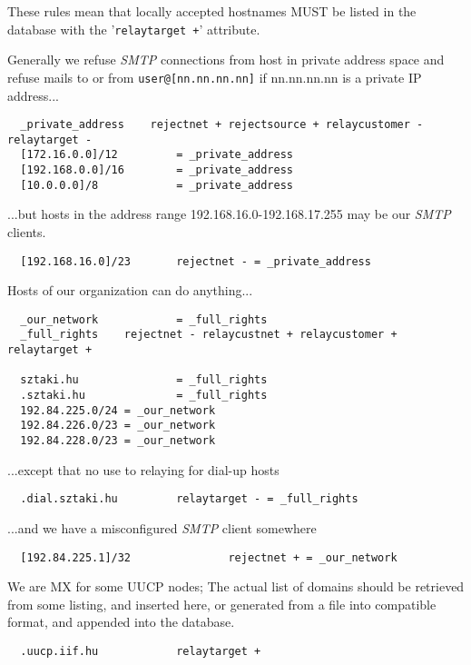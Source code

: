 These rules mean that locally accepted hostnames MUST be listed in
the database with the '{\tt relaytarget +}' attribute.

Generally we refuse {\em SMTP} connections from host in private address space
and refuse mails to or from {\tt user@[nn.nn.nn.nn]} if nn.nn.nn.nn is a
private IP address...

\begin{verbatim}
  _private_address    rejectnet + rejectsource + relaycustomer - relaytarget -
  [172.16.0.0]/12         = _private_address
  [192.168.0.0]/16        = _private_address
  [10.0.0.0]/8            = _private_address
\end{verbatim}


...but hosts in the address range 192.168.16.0-192.168.17.255 may be
our {\em SMTP} clients.

\begin{verbatim}
  [192.168.16.0]/23       rejectnet - = _private_address
\end{verbatim}


Hosts of our organization can do anything...

\begin{verbatim}
  _our_network            = _full_rights
  _full_rights    rejectnet - relaycustnet + relaycustomer + relaytarget +

  sztaki.hu               = _full_rights
  .sztaki.hu              = _full_rights
  192.84.225.0/24 = _our_network
  192.84.226.0/23 = _our_network
  192.84.228.0/23 = _our_network
\end{verbatim}


...except that no use to relaying for dial-up hosts

\begin{verbatim}
  .dial.sztaki.hu         relaytarget - = _full_rights
\end{verbatim}


...and we have a misconfigured {\em SMTP} client somewhere

\begin{verbatim}
  [192.84.225.1]/32               rejectnet + = _our_network
\end{verbatim}

We are MX for some UUCP nodes;  The actual list of domains should
be retrieved from some listing, and inserted here, or generated from
a file into compatible format, and appended into the database.

\begin{verbatim}
  .uucp.iif.hu            relaytarget +
\end{verbatim}


